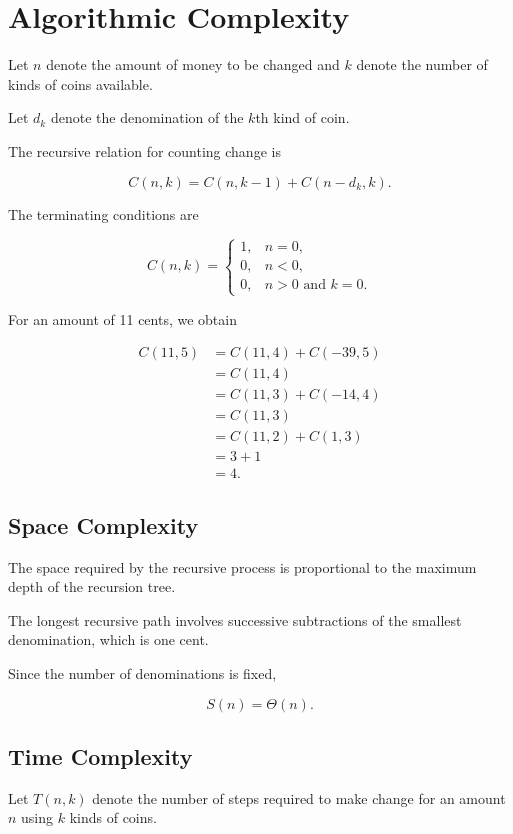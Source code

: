 \documentclass[10pt,letterpaper]{article}
\begin{document}
\section*{Algorithmic Complexity}

Let $n$ denote the amount of money to be changed
and $k$ denote the number of kinds of coins
available.

Let $d_k$ denote the denomination of the
$k$th kind of coin.

The recursive relation for counting change is

\[
    C(n,k) = C(n,k-1) + C(n-d_k,k).
\]

The terminating conditions are

\[
C(n,k) =
\begin{cases}
    1, & n=0,\\
    0, & n<0,\\
    0, & n>0 \text{ and } k=0.
\end{cases}
\]

For an amount of 11 cents, we obtain

\begin{align*}
    C(11,5)
        &= C(11,4) + C(-39,5)\\
        &= C(11,4)\\
        &= C(11,3) + C(-14,4)\\
        &= C(11,3)\\
        &= C(11,2) + C(1,3)\\
        &= 3+1\\
        &= 4.
\end{align*}

\subsection*{Space Complexity}

The space required by the recursive process is
proportional to the maximum depth of the
recursion tree.

The longest recursive path involves successive
subtractions of the smallest denomination,
which is one cent.

Since the number of denominations is fixed,

\[
    \boxed{S(n)=\Theta(n)}.
\]

\subsection*{Time Complexity}

Let $T(n,k)$ denote the number of steps required
to make change for an amount $n$ using $k$
kinds of coins.
\end{document}

